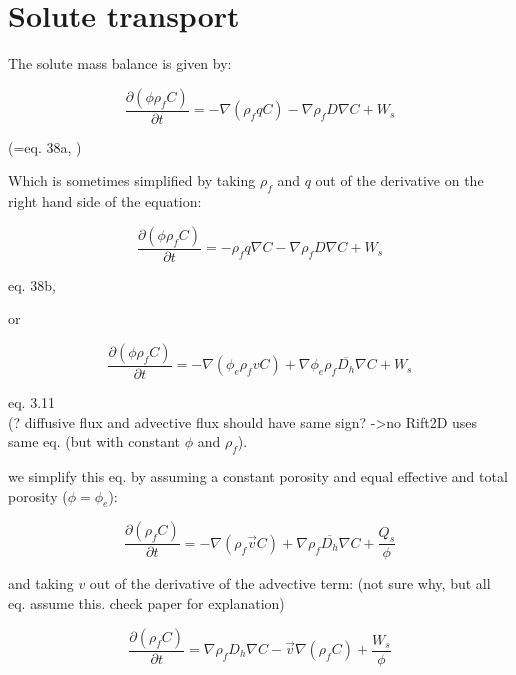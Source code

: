 \documentclass[11pt]{article}
\begin{document}
\pagebreak

\section{Solute transport}

The solute mass balance is given by:

\begin{equation}
	\frac{\partial (\phi \rho_f C)}{\partial t} = -\nabla (\rho_f q C) - \nabla \rho_f D \nabla C + W_s
\end{equation}

(=eq. 38a, \citep{Diersch2002})

Which is sometimes simplified by taking $\rho_f$ and $q$ out of the derivative on the right hand side of the equation:

\begin{equation}
	\frac{\partial (\phi \rho_f C)}{\partial t} = -\rho_f q \nabla C - \nabla \rho_f D \nabla C + W_s
\end{equation}

eq. 38b, \citep{Diersch2002}

or

\begin{equation}
	\frac{\partial (\phi \rho_f C)}{\partial t} = -\nabla (\phi_e \rho_f v  C) + \nabla \phi_e \rho_f \overline{D_h} \nabla C + W_s	
\end{equation}

eq. 3.11 \citep{Ingebritsen2006}\\
(? diffusive flux and advective flux should have same sign? ->no Rift2D uses same eq. (but with constant $\phi$ and $\rho_f$).

we simplify this eq. by assuming a constant porosity and equal effective and total porosity ($\phi = \phi_e$):

\begin{equation}
	\frac{\partial (\rho_f C)}{\partial t} = -\nabla ( \rho_f \vec{v}  C) + \nabla \rho_f \overline{D_h} \nabla C + \frac{Q_s}{\phi}	
\end{equation}

and taking $v$ out of the derivative of the advective term:
(not sure why, but all eq. assume this. check \cite{Diersch2002} paper for explanation)

\begin{equation}
	\frac{\partial (\rho_f C)}{\partial t} = \nabla \rho_f D_h \nabla C - \vec{v} \nabla ( \rho_f C) + \frac{W_s}{\phi}	
\end{equation}
\end{document}
